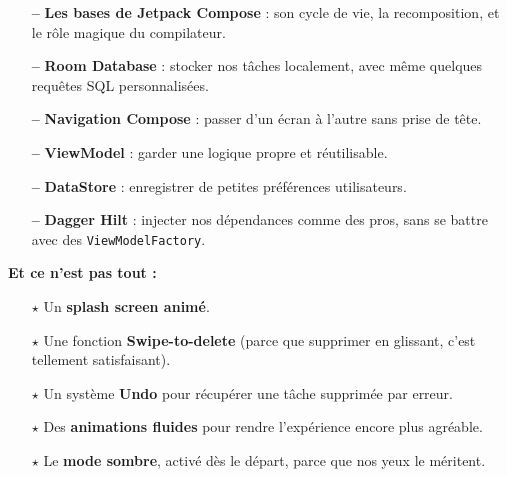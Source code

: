 \vspace{2em} %
\vspace{2em} %
\begin{tcolorbox}[colback=orange!5!white, colframe=orange!80!black, 
title=\textbf{Voici ce qui t’attend}, sharp corners, boxrule=0.6pt]

\begin{itemize}
    \item[\textbf{--}] \textbf{Les bases de Jetpack Compose} : son cycle de vie, la recomposition, et le rôle magique du compilateur.
    \item[\textbf{--}] \textbf{Room Database} : stocker nos tâches localement, avec même quelques requêtes SQL personnalisées.
    \item[\textbf{--}] \textbf{Navigation Compose} : passer d’un écran à l’autre sans prise de tête.
    \item[\textbf{--}] \textbf{ViewModel} : garder une logique propre et réutilisable.
    \item[\textbf{--}] \textbf{DataStore} : enregistrer de petites préférences utilisateurs.
    \item[\textbf{--}] \textbf{Dagger Hilt} : injecter nos dépendances comme des pros, sans se battre avec des \texttt{ViewModelFactory}.
\end{itemize}

\vspace{0.5em}
\textbf{Et ce n’est pas tout :}

\begin{itemize}
    \item[$\star$] Un \textbf{splash screen animé}.
    \item[$\star$] Une fonction \textbf{Swipe-to-delete} (parce que supprimer en glissant, c’est tellement satisfaisant).
    \item[$\star$] Un système \textbf{Undo} pour récupérer une tâche supprimée par erreur.
    \item[$\star$] Des \textbf{animations fluides} pour rendre l’expérience encore plus agréable.
    \item[$\star$] Le \textbf{mode sombre}, activé dès le départ, parce que nos yeux le méritent.
\end{itemize}

\end{tcolorbox}

\vspace{1em}

